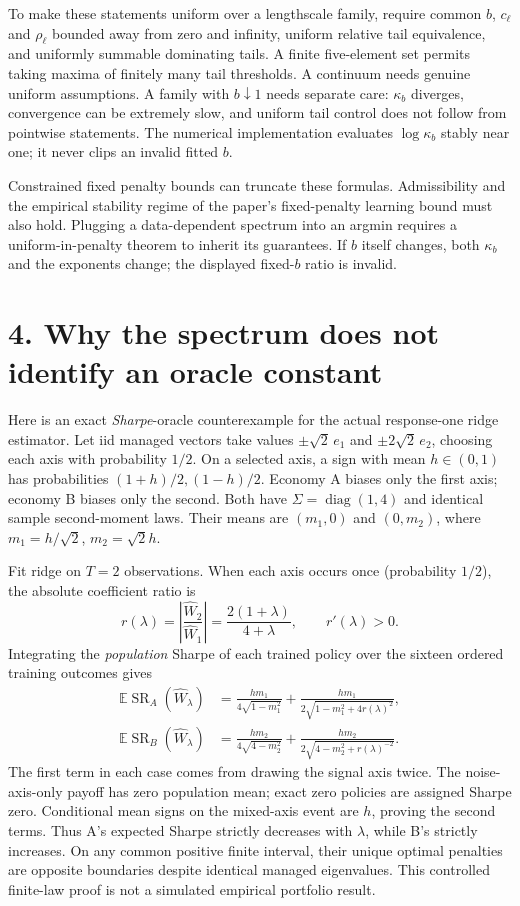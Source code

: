 \documentclass[11pt,letterpaper]{article}
\newcommand{\E}{\mathbb E}
\newcommand{\SR}{\operatorname{SR}}
\begin{document}
To make these statements uniform over a lengthscale family, require common $b$,
$c_\ell$ and $\rho_\ell$ bounded away from zero and infinity, uniform relative
tail equivalence, and uniformly summable dominating tails. A finite five-element
set permits taking maxima of finitely many tail thresholds. A continuum needs
genuine uniform assumptions. A family with $b\downarrow1$ needs separate care:
$\kappa_b$ diverges, convergence can be extremely slow, and uniform tail control
does not follow from pointwise statements. The numerical implementation evaluates
$\log\kappa_b$ stably near one; it never clips an invalid fitted $b$.

Constrained fixed penalty bounds can truncate these formulas. Admissibility and
the empirical stability regime of the paper's fixed-penalty learning bound must
also hold. Plugging a data-dependent spectrum into an argmin requires a
uniform-in-penalty theorem to inherit its guarantees. If $b$ itself changes,
both $\kappa_b$ and the exponents change; the displayed fixed-$b$ ratio is invalid.

\newpage
\section*{4. Why the spectrum does not identify an oracle constant}
Here is an exact \emph{Sharpe}-oracle counterexample for the actual response-one
ridge estimator. Let iid managed vectors take values
$\pm\sqrt2\,e_1$ and $\pm2\sqrt2\,e_2$, choosing each axis with probability
$1/2$. On a selected axis, a sign with mean $h\in(0,1)$ has probabilities
$(1+h)/2,(1-h)/2$. Economy A biases only the first axis; economy B biases only
the second. Both have $\Sigma=\operatorname{diag}(1,4)$ and identical sample
second-moment laws. Their means are $(m_1,0)$ and $(0,m_2)$, where
$m_1=h/\sqrt2$, $m_2=\sqrt2h$.

Fit ridge on $T=2$ observations. When each axis occurs once (probability $1/2$),
the absolute coefficient ratio is
\[
 r(\lambda)=\left|\frac{\widehat W_2}{\widehat W_1}\right|
 =\frac{2(1+\lambda)}{4+\lambda},\qquad r'(\lambda)>0.
\]
Integrating the \emph{population} Sharpe of each trained policy over the sixteen
ordered training outcomes gives
\begin{align*}
 \E\SR_A(\widehat W_\lambda)
 &=\frac{hm_1}{4\sqrt{1-m_1^2}}+
   \frac{hm_1}{2\sqrt{1-m_1^2+4r(\lambda)^2}},\\
 \E\SR_B(\widehat W_\lambda)
 &=\frac{hm_2}{4\sqrt{4-m_2^2}}+
   \frac{hm_2}{2\sqrt{4-m_2^2+r(\lambda)^{-2}}}.
\end{align*}
The first term in each case comes from drawing the signal axis twice. The
noise-axis-only payoff has zero population mean; exact zero policies are assigned
Sharpe zero. Conditional mean signs on the mixed-axis event are $h$, proving the
second terms. Thus A's expected Sharpe strictly decreases with $\lambda$, while
B's strictly increases. On any common positive finite interval, their unique
optimal penalties are opposite boundaries despite identical managed eigenvalues.
This controlled finite-law proof is not a simulated empirical portfolio result.
\end{document}
